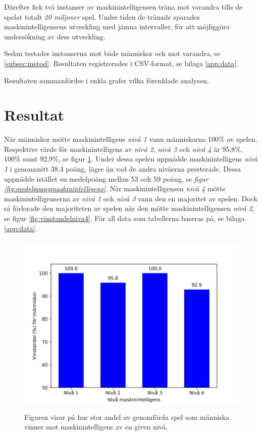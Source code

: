 \documentclass[12pt,a4paper]{article}
\begin{document}
    Därefter fick två instanser av maskinintelligensen träna mot varandra tills de spelat totalt \emph{20 miljoner} spel. Under tiden de tränade sparades maskinintelligensens utveckling med jämna intervaller, för att möjliggöra undersökning av dess utveckling.

    Sedan testades instanserna mot både människor och mot varandra, se \ref{subsec:metod}. Resultaten registrerades i CSV-format, se bilaga \ref{app:data}.

    Resultaten sammanfördes i enkla grafer vilka förenklade analysen.

  \section{Resultat}\label{sec:resultat} 
    När människor mötte maskinintelligens \emph{nivå 1} vann människorna 100\% av spelen. Respektive värde för maskinintelligens av \emph{nivå 2}, \emph{nivå 3} och \emph{nivå 4} är 95,8\%, 100\% samt 92,9\%, se figur \ref{fig:vinstandelmanniskor}. Under dessa spelen uppnådde maskinintelligens \emph{nivå 1} i genomsnitt 38,4 poäng, lägre än vad de andra nivåerna presterade. Dessa uppnådde istället en medelpoäng mellan 53 och 59 poäng, se \emph{figur \ref{fig:medelpoangmaskinintelligens}}. När maskinintelligensen \emph{nivå 4} mötte maskinintelligenserna av \emph{nivå 1} och \emph{nivå 3} vann den en majoritet av spelen. Dock så förlorade den majoriteten av spelen när den mötte maskinintelligensen \emph{nivå 2}, se figur \ref{fig:vinstandelniva4}. För all data som tabellerna baseras på, se bilaga \ref{app:data}.
    
    \begin{figure}[H]
      \centering
      \includegraphics[height=3.5in]{./images/vinstandel_manniskor.png}
      \caption{Figuren visar på hur stor andel av genomförda spel som människa vinner mot maskinintelligens av en given nivå.}
      \label{fig:vinstandelmanniskor} 
    \end{figure}
    
\end{document}
